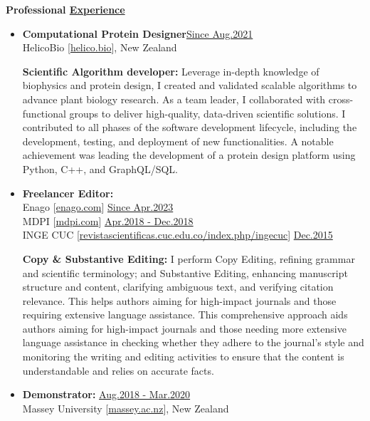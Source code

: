 
{\bf\Large Professional \href{.}{Experience}}

\begin{itemize}


    \item {\bf Computational Protein Designer}\hfill \href{.}{Since Aug.2021}\\
          HelicoBio [\href{www.helico.bio}{helico.bio}],
          New Zealand

              {\noindent
                  \textbf{Scientific Algorithm developer:}
                  Leverage in-depth knowledge of biophysics and protein design, I created and validated scalable algorithms to advance plant biology research. As a team leader, I collaborated with cross-functional groups to deliver high-quality, data-driven scientific solutions. I contributed to all phases of the software development lifecycle, including the development, testing, and deployment of new functionalities. A notable achievement was leading the development of a protein design platform using Python, C++, and GraphQL/SQL.
              }

    \item {\bf Freelancer Editor:}\\
          Enago [\href{https://www.enago.com/}{enago.com}] \hfill
          \href{.}{Since Apr.2023}\\
          MDPI [\href{https://www.mdpi.com/}{mdpi.com}] \hfill
          \href{.}{Apr.2018 - Dec.2018}\\
          INGE CUC [\href{https://revistascientificas.cuc.edu.co/index.php/ingecuc}{revistascientificas.cuc.edu.co/index.php/ingecuc}] \hfill
          \href{.}{Dec.2015}

          {\noindent
              \textbf{Copy \& Substantive Editing:}
              I perform Copy Editing, refining grammar and scientific terminology; and Substantive Editing, enhancing manuscript structure and content, clarifying ambiguous text, and verifying citation relevance. This helps authors aiming for high-impact journals and those requiring extensive language assistance. This comprehensive approach aids authors aiming for high-impact journals and those needing more extensive language assistance in checking whether they adhere to the journal's style and monitoring the writing and editing activities to ensure that the content is understandable and relies on accurate facts.
          }

    \item {\bf Demonstrator:} \hfill \href{.}{Aug.2018 - Mar.2020}\\
          Massey University [\href{www.massey.ac.nz}{massey.ac.nz}],
          New Zealand


\end{itemize}
